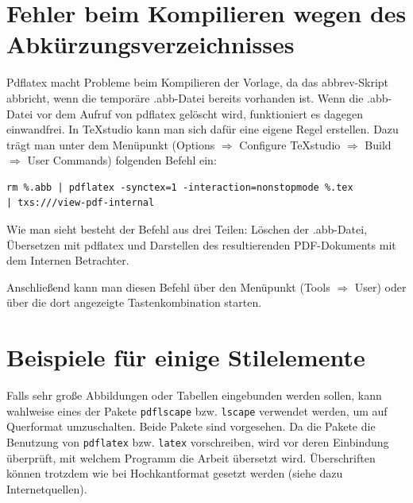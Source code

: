 \section{Fehler beim Kompilieren wegen des Abkürzungsverzeichnisses}

Pdflatex macht Probleme beim Kompilieren der Vorlage, da das abbrev-Skript abbricht, wenn die temporäre .abb-Datei bereits vorhanden ist. Wenn die .abb-Datei vor dem Aufruf von pdflatex gelöscht wird, funktioniert es dagegen einwandfrei. In TeXstudio kann man sich dafür eine eigene Regel erstellen. Dazu trägt man unter dem Menüpunkt (Options $\Rightarrow$ Configure TeXstudio $\Rightarrow$ Build $\Rightarrow$ User Commands) folgenden Befehl ein:

\begin{verbatim}
rm %.abb | pdflatex -synctex=1 -interaction=nonstopmode %.tex
| txs:///view-pdf-internal
\end{verbatim}

Wie man sieht besteht der Befehl aus drei Teilen: Löschen der .abb-Datei, Übersetzen mit pdflatex und Darstellen des resultierenden PDF-Dokuments mit dem Internen Betrachter.

Anschließend kann man diesen Befehl über den Menüpunkt (Tools $\Rightarrow$ User) oder über die dort angezeigte Tastenkombination starten.

\section{Beispiele für einige Stilelemente}
Falls sehr große Abbildungen oder Tabellen eingebunden werden sollen,
kann wahlweise eines der Pakete \verb!pdflscape! bzw. \verb!lscape! verwendet
werden, um auf Querformat umzuschalten. Beide Pakete sind vorgesehen. Da die
Pakete die Benutzung von \verb!pdflatex! bzw. \verb!latex! vorschreiben, wird
vor deren Einbindung überprüft, mit welchem Programm die Arbeit übersetzt wird.
Überschriften können trotzdem wie bei Hochkantformat gesetzt werden (siehe dazu
Internetquellen).

